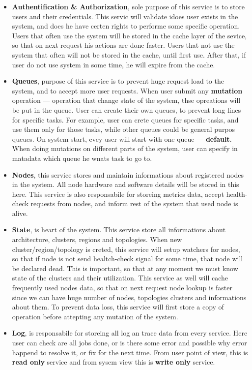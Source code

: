 \begin{itemize}
	\item \textbf{Authentification \& Authorization}, sole purpose of this service is to store users and their credentials. This servic will validate idoes user exists in the system, and does he have certen rights to performe some specific operation. Users that often use the system will be stored in the cache layer of the sevice, so that on next request his actions are done faster. Users that not use the system that often will not be stored in the cache, until first use. After that, if user do not use system in some time, he will expire from the cache.
	\item \textbf{Queues}, purpose of this service is to prevent huge request load to the system, and to accept more user requests. When user submit any \textbf{mutation} operation --- operation that change state of the system, thse opreations will be put in the queue. User can create their own queues, to prevent long lines for specific tasks. For example, user can crete queues for specific tasks, and use them only for those tasks, while other queues could be general purpos queues. On system start, evey user will start with one queue --- \textbf{default}. When doing mutations on different parts of the system, user can specify in matadata which queue he wnats task to go to.
	\item \textbf{Nodes}, this service stores and maintain informations about registered nodes in the system. All node hardware and software details will be stored in this here. This service is also responsabile for storeing metrics data, accept health-check requests from nodes, and inform rest of the system that used node is alive.
	\item \textbf{State}, is heart of the system. This service store all informations about architecture, clusters, regions and topologies. When new cluster/region/topology is creted, this service will setup watchers for nodes, so that if node is not send healtch-check signal for some time, that node will be declared dead. This is important, so that at any moment we must know state of the clusters and their utilization. This service as well will cache frequently used nodes data, so that on next request node lookup is faster since we can have huge number of nodes, topologies clusters and informations about them. To prevent data loss, this service will first store a copy of operation before attepting any mutation of the system.
	\item \textbf{Log}, is responsabile for storeing all log an trace data from every service. Here user can check are all jobs done, or is there some error and possible why error happend to resolve it, or fix for the next time. From user point of view, this is \textbf{read only} service and from sysem view this is \textbf{write only} service.

\end{itemize}
